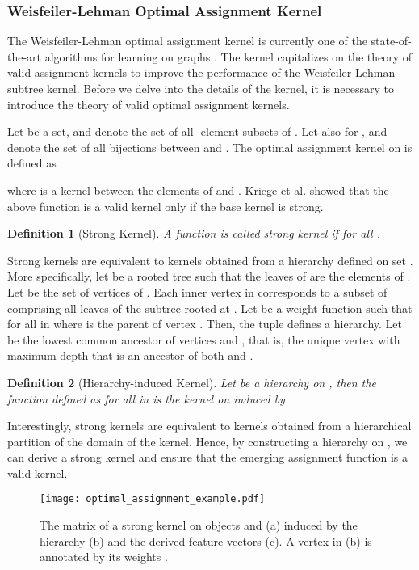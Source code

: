\documentclass[twoside,11pt]{article}
\newtheorem{definition}{Definition}
\begin{document}
\subsubsection{Weisfeiler-Lehman Optimal Assignment Kernel}
The Weisfeiler-Lehman optimal assignment kernel is currently one of the state-of-the-art algorithms for learning on graphs \cite{kriege2016valid}.
The kernel capitalizes on the theory of valid assignment kernels to improve the performance of the Weisfeiler-Lehman subtree kernel.
Before we delve into the details of the kernel, it is necessary to introduce the theory of valid optimal assignment kernels.

Let  be a set, and  denote the set of all -element subsets of .
Let also  for , and  denote the set of all bijections between  and .
The optimal assignment kernel on  is defined as

where  is a kernel between the elements of  and .
Kriege et al. \citeyear{kriege2016valid} showed that the above function  is a valid kernel only if the base kernel  is strong.
\begin{definition}[Strong Kernel]
  A function  is called strong kernel if  for all .
\end{definition}
Strong kernels are equivalent to kernels obtained from a hierarchy defined on set .
More specifically, let  be a rooted tree such that the leaves of  are the elements of .
Let  be the set of vertices of .
Each inner vertex  in  corresponds to a subset of  comprising all leaves of the subtree rooted at .
Let  be a weight function such that  for all  in  where  is the parent of vertex .
Then, the tuple  defines a hierarchy.
Let  be the lowest common ancestor of vertices  and , that is, the unique vertex with maximum depth that is an ancestor of both  and .
\begin{definition}[Hierarchy-induced Kernel]
  Let  be a hierarchy on , then the function defined as  for all  in  is the kernel on  induced by .
\end{definition}
Interestingly, strong kernels are equivalent to kernels obtained from a hierarchical partition of the domain of the kernel. 
Hence, by constructing a hierarchy on , we can derive a strong kernel  and ensure that the emerging assignment function is a valid kernel.

\begin{figure}[t]
  \centering
  \texttt{[image: optimal\_assignment\_example.pdf]}
    \caption{The matrix of a strong kernel on objects  and  (a) induced by the hierarchy (b) and the derived feature vectors (c). A vertex  in (b) is annotated by its weights .}
    \label{fig:optimal_assignment_example}
\end{figure}
\end{document}
